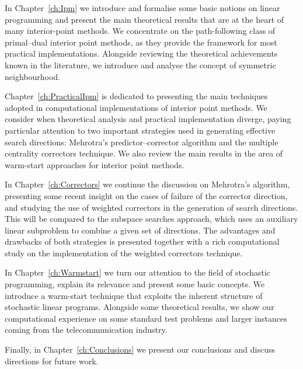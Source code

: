 In Chapter~\ref{ch:Ipm} we introduce and formalise some basic
notions on linear programming and present the main theoretical results 
that are at the heart of many interior-point methods. 
We concentrate on the path-following class of
primal--dual interior point methods, as they provide the framework for 
most practical implementations.
Alongside reviewing the theoretical achievements known in the
literature, we introduce and analyse the concept of 
symmetric neighbourhood.

Chapter~\ref{ch:PracticalIpm} is dedicated to presenting
the main techniques adopted in computational implementations of
interior point methods.
We consider when
theoretical analysis and practical implementation diverge,
paying particular attention to two important strategies used 
in generating effective search directions: 
Mehrotra's predictor--corrector algorithm and the
multiple centrality correctors technique.
We also review the main results in the area of warm-start
approaches for interior point methods.

In Chapter~\ref{ch:Correctors} we continue the discussion on
Mehrotra's algorithm, presenting some recent insight on the
cases of failure of the corrector direction, and studying the use of
weighted correctors in the generation of search directions. This will
be compared to the subspace searches approach, which uses
an auxiliary linear subproblem to combine
a given set of directions. The advantages
and drawbacks of both strategies is presented together with
a rich computational study on the implementation of the
weighted correctors technique.

In Chapter~\ref{ch:Warmstart} we turn our attention to the field
of stochastic programming, explain its relevance and present some
basic concepts.
We introduce a warm-start technique
that exploits the inherent structure of stochastic linear programs.
Alongside some theoretical results, we show our computational
experience on some standard test problems and larger instances coming
from the telecommunication industry.

\enlargethispage{\baselineskip}
Finally, in Chapter~\ref{ch:Conclusions} we present our conclusions
and discuss directions for future work.
